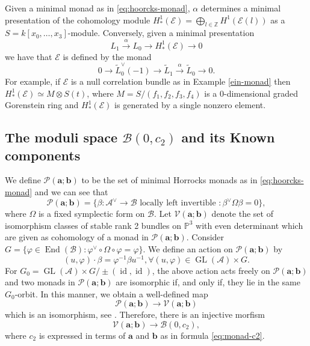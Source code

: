 \documentclass[twoside,reqno]{amsart}
\theoremstyle{plain}
\newcommand{\lra}{\longrightarrow}
\newcommand{\ZZ}{\mathbb{Z}}
\DeclareMathOperator{\End}{End}
\DeclareMathOperator{\gl}{GL}
\newcommand{\E}{\mathcal{E}}
\newcommand{\cA}{\mathcal{A}}
\newcommand{\cB}{\mathcal{B}}
\DeclareMathOperator{\id}{id}
\begin{document}
%
Given a minimal monad as in \eqref{eq:hoorcks-monad}, $\alpha$ determines a minimal presentation of the cohomology module $H^1_*(\E) = \bigoplus_{l\in \ZZ} H^1(\E(l))$ as a $S= k[x_0,\dots,x_3]$-module. Conversely, given a minimal presentation
\[
L_1 \stackrel{\alpha}{\lra} L_0 \lra H^1_*(\E) \lra 0
\]
we have that $\E$ is defined by the monad
\[
0 \lra \widetilde{L}_0^\vee(-1) \lra \widetilde{L}_1  \stackrel{\alpha}{\lra} \widetilde{L}_0 \lra 0. 
\]
For example, if $\E$ is a null correlation bundle as in Example \ref{ein-monad} then 
$H^1_*(\E)\simeq M\otimes S(t)$, where $M=S/(f_1,f_2,f_3,f_4)$ is a $0$-dimensional graded Gorenstein 
ring and $H^1_*(\E)$ is generated by 
a single nonzero element.
%
\subsection{The moduli space $\mathcal{B}(0,c_2)$ and its Known components}
We define $\mathcal{P}(\boldsymbol{a}; \boldsymbol{b})$ to be the set of minimal Horrocks monads as in \eqref{eq:hoorcks-monad} and we can see that
$$\mathcal{P}(\boldsymbol{a}; \boldsymbol{b})=\{\beta:\cA^\vee\rightarrow\cB \mbox{ locally left invertible }: \beta^\vee\Omega\beta=0\},$$ 
where $\Omega$ is a fixed symplectic form on $\cB$. Let $\mathcal{V}(\boldsymbol{a}; \boldsymbol{b})$ denote the set of isomorphism 
classes of stable rank 2 bundles on $\mathbb{P}^3$ with even determinant which are given as cohomology 
of a monad in $\mathcal{P}(\boldsymbol{a}; \boldsymbol{b})$. Consider 
$G=\{\varphi\in\End(\cB):\varphi^\vee\circ\Omega\circ\varphi=\varphi\}$. We define an action on 
$\mathcal{P}(\boldsymbol{a}; \boldsymbol{b})$ by
$$(u,\varphi)\cdot\beta=\varphi^{-1}\beta u^{-1}, \forall (u,\varphi)\in\gl(\cA)\times G.$$
For $G_0=\gl(\cA)\times G/\pm(\id,\id)$, the above action acts freely on $\mathcal{P}(\boldsymbol{a}; \boldsymbol{b})$ 
and two monads in $\mathcal{P}(\boldsymbol{a}; \boldsymbol{b})$ are isomorphic if, and 
only if, they lie in the same $G_0$-orbit. In this manner, we obtain a well-defined map
$$\mathcal{P}(\boldsymbol{a}; \boldsymbol{b})\longrightarrow\mathcal{V}(\boldsymbol{a}; \boldsymbol{b})$$
which is an isomorphism, see \cite[Section 8]{MF2021}. Therefore, there is an injective morfism
$$\mathcal{V}(\boldsymbol{a}; \boldsymbol{b})\longrightarrow\mathcal{B}(0,c_2),$$
where $c_2$ is expressed in terms of $\boldsymbol{a}$ and $\boldsymbol{b}$ as in formula \eqref{eq:monad-c2}.
\end{document}
